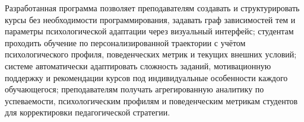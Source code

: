\documentclass[a4paper,12pt]{article}
\begin{document}
Разработанная программа позволяет преподавателям создавать и структурировать курсы без необходимости программирования, задавать граф зависимостей тем и параметры психологической адаптации через визуальный интерфейс; студентам проходить обучение по персонализированной траектории с учётом психологического профиля, поведенческих метрик и текущих внешних условий; системе автоматически адаптировать сложность заданий, мотивационную поддержку и рекомендации курсов под индивидуальные особенности каждого обучающегося; преподавателям получать агрегированную аналитику по успеваемости, психологическим профилям и поведенческим метрикам студентов для корректировки педагогической стратегии.

\pagebreak

\printbibliography

\pagebreak

\renewcommand{\appendixpagename}{\centering Приложения}
\end{document}
